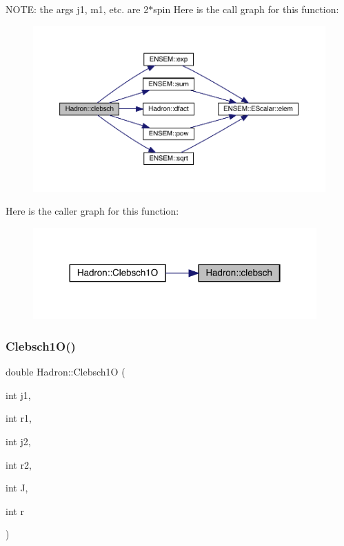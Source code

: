 N\+O\+TE\+: the args j1, m1, etc. are 2$\ast$spin Here is the call graph for this function\+:
\nopagebreak
\begin{figure}[H]
\begin{center}
\leavevmode
\includegraphics[width=350pt]{d1/daf/namespaceHadron_ac4cba1d4aa3863fdc7991c208b3b9594_cgraph}
\end{center}
\end{figure}
Here is the caller graph for this function\+:\nopagebreak
\begin{figure}[H]
\begin{center}
\leavevmode
\includegraphics[width=308pt]{d1/daf/namespaceHadron_ac4cba1d4aa3863fdc7991c208b3b9594_icgraph}
\end{center}
\end{figure}
\mbox{\label{namespaceHadron_a78e0e843ad34636504d3ab3f2280e5e5}} 
\subsubsection{\texorpdfstring{Clebsch1O()}{Clebsch1O()}}
{\footnotesize\ttfamily double Hadron\+::\+Clebsch1O (\begin{DoxyParamCaption}\item[{int}]{j1,  }\item[{int}]{r1,  }\item[{int}]{j2,  }\item[{int}]{r2,  }\item[{int}]{J,  }\item[{int}]{r }\end{DoxyParamCaption})}



